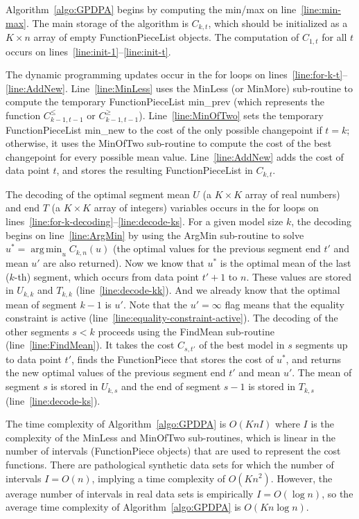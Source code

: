 \documentclass{article}
\newcommand{\FCC}{C}
\DeclareMathOperator*{\argmin}{arg\,min}
\begin{document}
Algorithm~\ref{algo:GPDPA} begins by computing the min/max on
line~\ref{line:min-max}.  The main storage of the algorithm is
$\FCC_{k,t}$, which should be initialized as a $K\times n$ array of
empty FunctionPieceList objects. The computation of $\FCC_{1,t}$ for
all $t$ occurs on lines~\ref{line:init-1}--\ref{line:init-t}. 

The dynamic programming updates occur in the for loops on
lines~\ref{line:for-k-t}--\ref{line:AddNew}. Line~\ref{line:MinLess}
uses the MinLess (or MinMore) sub-routine to compute the temporary
FunctionPieceList min\_prev (which represents the function
$\FCC_{k-1,t-1}^\leq$ or
$\FCC_{k-1,t-1}^\geq$). Line~\ref{line:MinOfTwo} sets the temporary
FunctionPieceList min\_new to the cost of the only possible
changepoint if $t=k$; otherwise, it uses the MinOfTwo sub-routine to
compute the cost of the best changepoint for every possible mean
value. Line~\ref{line:AddNew} adds the cost of data point $t$, and
stores the resulting FunctionPieceList in $\FCC_{k,t}$.

The decoding of the optimal segment mean $U$ (a $K\times K$ array of
real numbers) and end $T$ (a $K\times K$ array of integers) variables
occurs in the for loops on
lines~\ref{line:for-k-decoding}--\ref{line:decode-ks}. For a given
model size $k$, the decoding begins on line~\ref{line:ArgMin} by using
the ArgMin sub-routine to solve $u^* = \argmin_u \FCC_{k,n}(u)$ (the
optimal values for the previous segment end $t'$ and mean $u'$ are
also returned). Now we know that $u^*$ is the optimal mean of the last
($k$-th) segment, which occurs from data point $t'+1$ to $n$. These
values are stored in $U_{k,k}$ and $T_{k,k}$
(line~\ref{line:decode-kk}). And we already know that the optimal mean
of segment $k-1$ is $u'$.  Note that the $u'=\infty$ flag means that
the equality constraint is active
(line~\ref{line:equality-constraint-active}). The decoding of the
other segments $s<k$ proceeds using the FindMean sub-routine
(line~\ref{line:FindMean}). It takes the cost $\FCC_{s,t'}$ of the
best model in $s$ segments up to data point $t'$, finds the
FunctionPiece that stores the cost of $u^*$, and returns the new
optimal values of the previous segment end $t'$ and mean $u'$. The
mean of segment $s$ is stored in $U_{k,s}$ and the end of segment
$s-1$ is stored in $T_{k,s}$ (line~\ref{line:decode-ks}).

The time complexity of Algorithm~\ref{algo:GPDPA} is $O(K n I)$ where
$I$ is the complexity of the MinLess and MinOfTwo sub-routines, which
is linear in the number of intervals (FunctionPiece objects) that are
used to represent the cost functions. There are pathological synthetic
data sets for which the number of intervals $I=O(n)$, implying a
time complexity of $O(K n^2)$. However, the average number
of intervals in real data sets is empirically $I=O(\log n)$, so the
average time complexity of Algorithm~\ref{algo:GPDPA} is
$O(K n \log n)$.
\end{document}
